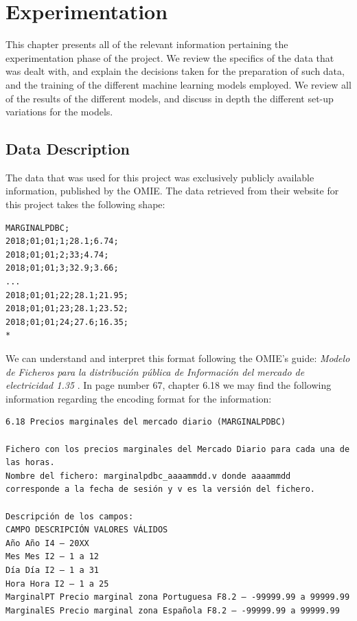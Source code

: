 \documentclass[12pt]{report} %
\begin{document}
\chapter{Experimentation}
\label{chap:04}
This chapter presents all of the relevant information pertaining the experimentation phase of the project. We review the specifics of the data that was dealt with, and explain the decisions taken for the preparation of such data, and the training of the different machine learning models employed. We review all of the results of the different models, and discuss in depth the different set-up variations for the models.


\section{Data Description} %
The data that was used for this project was exclusively publicly available information, published by the OMIE. The data retrieved from their website \cite{omie_datos} for this project takes the following shape:

\begin{small}
\begin{verbatim}
MARGINALPDBC;
2018;01;01;1;28.1;6.74;
2018;01;01;2;33;4.74;
2018;01;01;3;32.9;3.66;
...
2018;01;01;22;28.1;21.95;
2018;01;01;23;28.1;23.52;
2018;01;01;24;27.6;16.35;
*
\end{verbatim}
\end{small}

We can understand and interpret this format following the OMIE's guide: \textit{Modelo de Ficheros para la distribución pública de Información del mercado de electricidad 1.35} \cite{omie_formatos_2024}. In page number 67, chapter 6.18 we may find the following information regarding the encoding format for the information:

\begin{small} %
\begin{verbatim}
6.18 Precios marginales del mercado diario (MARGINALPDBC)

Fichero con los precios marginales del Mercado Diario para cada una de
las horas.
Nombre del fichero: marginalpdbc_aaaammdd.v donde aaaammdd
corresponde a la fecha de sesión y v es la versión del fichero.

Descripción de los campos:
CAMPO DESCRIPCIÓN VALORES VÁLIDOS
Año Año I4 – 20XX
Mes Mes I2 – 1 a 12
Día Día I2 – 1 a 31
Hora Hora I2 – 1 a 25
MarginalPT Precio marginal zona Portuguesa F8.2 – -99999.99 a 99999.99
MarginalES Precio marginal zona Española F8.2 – -99999.99 a 99999.99
\end{verbatim}
\end{small}
\end{document}
